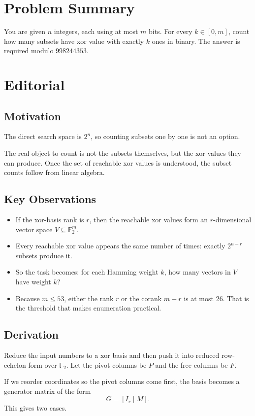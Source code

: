 \section{Problem Summary}
You are given \(n\) integers, each using at most \(m\) bits. For every \(k \in [0,m]\), count how many subsets have xor value with exactly \(k\) ones in binary. The answer is required modulo \(998244353\).

\section{Editorial}
\subsection{Motivation}
The direct search space is \(2^n\), so counting subsets one by one is not an option.

The real object to count is not the subsets themselves, but the xor values they can produce. Once the set of reachable xor values is understood, the subset counts follow from linear algebra.

\subsection{Key Observations}
\begin{itemize}
\item If the xor-basis rank is \(r\), then the reachable xor values form an \(r\)-dimensional vector space \(V \subseteq \mathbb{F}_2^m\).
\item Every reachable xor value appears the same number of times: exactly \(2^{n-r}\) subsets produce it.
\item So the task becomes: for each Hamming weight \(k\), how many vectors in \(V\) have weight \(k\)?
\item Because \(m \le 53\), either the rank \(r\) or the corank \(m-r\) is at most \(26\). That is the threshold that makes enumeration practical.
\end{itemize}

\subsection{Derivation}
Reduce the input numbers to a xor basis and then push it into reduced row-echelon form over \(\mathbb{F}_2\). Let the pivot columns be \(P\) and the free columns be \(F\).

If we reorder coordinates so the pivot columns come first, the basis becomes a generator matrix of the form
\[
G = [I_r \mid M].
\]
This gives two cases.

